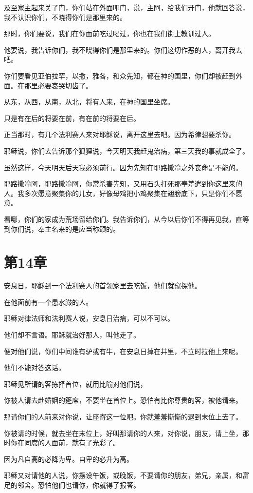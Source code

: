 \documentclass[12pt,oneside]{book}
\begin{document}
及至家主起来关了门，你们站在外面叩门，说，主阿，给我们开门，他就回答说，我不认识你们，不晓得你们是那里来的。

那时，你们要说，我们在你面前吃过喝过，你也在我们街上教训过人。

他要说，我告诉你们，我不晓得你们是那里来的。你们这切作恶的人，离开我去吧。

你们要看见亚伯拉罕，以撒，雅各，和众先知，都在神的国里，你们却被赶到外面。在那里必要哀哭切齿了。

从东，从西，从南，从北，将有人来，在神的国里坐席。

只是有在后的将要在前，有在前的将要在后。

正当那时，有几个法利赛人来对耶稣说，离开这里去吧。因为希律想要杀你。

耶稣说，你们去告诉那个狐狸说，今天明天我赶鬼治病，第三天我的事就成全了。

虽然这样，今天明天后天我必须前行。因为先知在耶路撒冷之外丧命是不能的。

耶路撒冷阿，耶路撒冷阿，你常杀害先知，又用石头打死那奉差遣到你这里来的人。我多次愿意聚集你的儿女，好像母鸡把小鸡聚集在翅膀底下，只是你们不愿意。

看哪，你们的家成为荒场留给你们。我告诉你们，从今以后你们不得再见我，直等到你们说，奉主名来的是应当称颂的。

\chapter{第14章}
安息日，耶稣到一个法利赛人的首领家里去吃饭，他们就窥探他。

在他面前有一个患水臌的人。

耶稣对律法师和法利赛人说，安息日治病，可以不可以。

他们却不言语。耶稣就治好那人，叫他走了。

便对他们说，你们中间谁有驴或有牛，在安息日掉在井里，不立时拉他上来呢。

他们不能对答这话。

耶稣见所请的客拣择首位，就用比喻对他们说，

你被人请去赴婚姻的筵席，不要坐在首位上。恐怕有比你尊贵的客，被他请来。

那请你们的人前来对你说，让座寄这一位吧。你就羞羞惭惭的退到末位上去了。

你被请的时候，就去坐在末位上，好叫那请你的人来，对你说，朋友，请上坐，那时你在同席的人面前，就有了光彩了。

因为凡自高的必降为卑。自卑的必升为高。

耶稣又对请他的人说，你摆设午饭，或晚饭，不要请你的朋友，弟兄，亲属，和富足的邻舍。恐怕他们也请你，你就得了报答。
\end{document}
